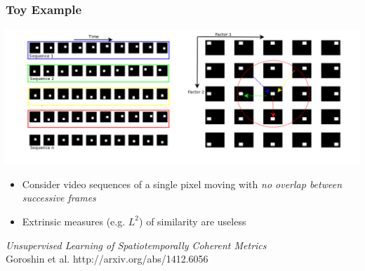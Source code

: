 \documentclass{beamer}
\begin{document}
\begin{frame} 
\frametitle{Toy Example}
\begin{center} 
\includegraphics[scale=0.25]{./Figures/toy_video.png}
\end{center} 
\begin{itemize} 
\item{Consider video sequences of a single pixel moving with \emph{no overlap between successive frames}}
\item{Extrinsic measures (e.g. $L^2$) of similarity are useless}
\end{itemize} 
\end{frame} 

\begin{frame}
\begin{center} 
\huge \color{blue} \emph{Unsupervised Learning of Spatiotemporally Coherent Metrics}
\\ \vspace{2.5cm} 
\small{Goroshin et al. http://arxiv.org/abs/1412.6056}
\end{center} 
\end{frame}
\end{document}
